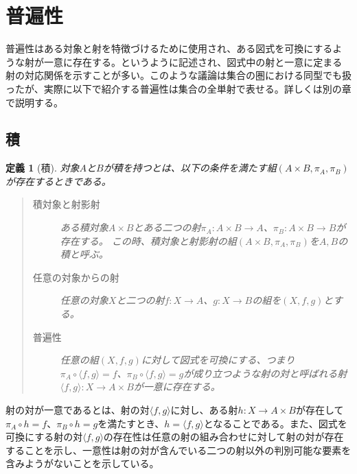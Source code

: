 \documentclass[dvipdfmx]{jsarticle}
\newcommand{\arrow}{\rightarrow}
\newcommand{\tuple}[1]{\langle #1\rangle}
\newcommand{\mor}[3]{#1:#2\arrow #3}
\newtheorem{define}{定義}[section]
\numberwithin{proof}{subsection}
\numberwithin{prop}{subsection}
\numberwithin{define}{subsection}
\begin{document}
	\section{普遍性}
	普遍性はある対象と射を特徴づけるために使用され、ある図式を可換にするような射が一意に存在する。というように記述され、図式中の射と一意に定まる射の対応関係を示すことが多い。このような議論は集合の圏における同型でも扱ったが、実際に以下で紹介する普遍性は集合の全単射で表せる。詳しくは別の章で説明する。
	\subsection{積}
	\begin{define}[積]
		対象$A$と$B$が積を持つとは、以下の条件を満たす組$(A\times B,\pi_A,\pi_B)$が存在するときである。
		\begin{quote}
			\begin{description}
			\item[積対象と射影射]ある積対象$A\times B$とある二つの射$\mor{\pi_A}{A\times B}{A}$、$\mor{\pi_B}{A\times B}{B}$が存在する。
			この時、積対象と射影射の組$(A\times B,\pi_A,\pi_B)$を$A,B$の積と呼ぶ。
			\item[任意の対象からの射]任意の対象$X$と二つの射$\mor{f}{X}{A}$、$\mor{g}{X}{B}$の組を$(X,f,g)$とする。
			\item[普遍性]任意の組$(X,f,g)$に対して図式を可換にする、つまり$\pi_A\circ\tuple{f,g}=f$、$\pi_B\circ\tuple{f,g}=g$が成り立つような射の対と呼ばれる射$\mor{\tuple{f,g}}{X}{A\times B}$が一意に存在する。
			\end{description}
		\end{quote}
		\begin{center}
		\end{center}
	\end{define}

	射の対が一意であるとは、射の対$\tuple{f,g}$に対し、ある射$\mor{h}{X}{A\times B}$が存在して$\pi_A\circ h=f$、$\pi_B\circ h=g$を満たすとき、$h=\tuple{f,g}$となることである。また、図式を可換にする射の対$\tuple{f,g}$の存在性は任意の射の組み合わせに対して射の対が存在することを示し、一意性は射の対が含んでいる二つの射以外の判別可能な要素を含みようがないことを示している。
\end{document}
